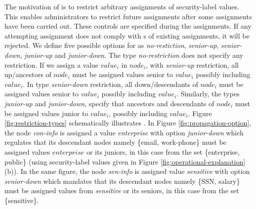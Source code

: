  
 
 The motivation of \assignmentControl{} is to restrict arbitrary assignments of security-label values. This enables administrators to restrict future assignments after some assignments have been carried out.  These controls are specified during the assignments. If any attempting assignment does not comply with \assignmentControl{}s of existing assignments, it will be rejected. We define five possible options for \assignmentControl{} as \textit{no-restiction}, \textit{senior-up}, \textit{senior-down}, \textit{junior-up} and \textit{junior-down}. The type \textit{no-restriction} does not specify any restriction. If we assign a value $value_i$ in $node_i$, with \textit{senior-up} restriction, all up/ancestors of $node_i$ must be assigned values senior to $value_i$ possibly including $value_i$. In type \textit{senior-down} restriction, all down/descendants of $node_i$ must be assigned values senior to $value_i$ possibly including $value_i$.  Similarly, the types \textit{junior-up} and \textit{junior-down}, specify that ancestors and descendants of $node_i$ must be assigned  values junior to $value_i$, possibly including $value_i$.  Figure \ref{fig:restriction-types} schematically illustrates \assignmentControl{}. In Figure \ref{fig:propagation-option}, the node \textit{con-info} is assigned a value \textit{enterprise} with option \textit{junior-down} which regulates that its descendant nodes namely \{email, work-phone\} must be assigned values $enterprise$ or its juniors, in this case from the set \{enterprise, public\} (using security-label values given in Figure \ref{fig:operational-explanation}(b)). In the same figure, the node \textit{sen-info} is assigned value \textit{sensitive} with option \textit{senior-down} which mandates that its descendant nodes namely \{SSN, salary\} must be assigned values from \textit{sensitive} or its seniors, in this case from the set \{sensitive\}.


